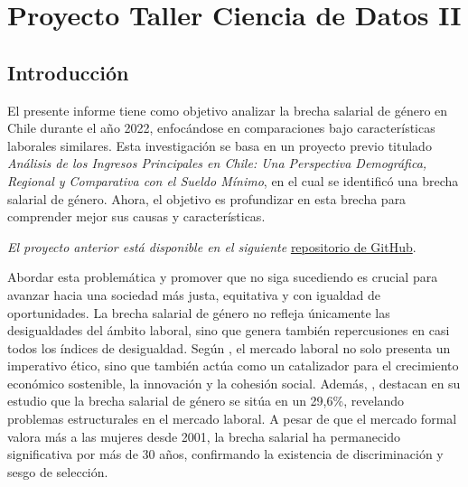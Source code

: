 \rhead{\newtitle}
\cfoot{\thepage}
\renewcommand{\headrulewidth}{1pt}
\renewcommand{\footrulewidth}{1pt}
\chapter{Proyecto Taller Ciencia de Datos II}

\section{Introducción}

El presente informe tiene como objetivo analizar la brecha salarial de género en Chile durante el año 2022, enfocándose en comparaciones bajo características laborales similares. Esta investigación se basa en un proyecto previo titulado \textit{Análisis de los Ingresos Principales en Chile: Una Perspectiva Demográfica, Regional y Comparativa con el Sueldo Mínimo}, en el cual se identificó una brecha salarial de género. Ahora, el objetivo es profundizar en esta brecha para comprender mejor sus causas y características. 
\begin{center}
    {\footnotesize \textit{El proyecto anterior está disponible en el siguiente} \href{https://github.com/ElK1000o/Taller-Ciencia-de-Datos-I/tree/main/Proyecto}{repositorio de GitHub}.}
\end{center}
Abordar esta problemática y promover que no siga sucediendo es crucial para avanzar hacia una sociedad más justa, equitativa y con igualdad de oportunidades. La brecha salarial de género no refleja únicamente las desigualdades del ámbito laboral, sino que genera también repercusiones en casi todos los índices de desigualdad. Según \citet{Castro-Romero2024}, el mercado laboral no solo presenta un imperativo ético, sino que también actúa como un catalizador para el crecimiento económico sostenible, la innovación y la cohesión social. Además, \citet{Cuellar2022}, destacan en su estudio que la brecha salarial de género se sitúa en un 29,6\%, revelando problemas estructurales en el mercado laboral. A pesar de que el mercado formal valora más a las mujeres desde 2001, la brecha salarial ha permanecido significativa por más de 30 años, confirmando la existencia de discriminación y sesgo de selección.


